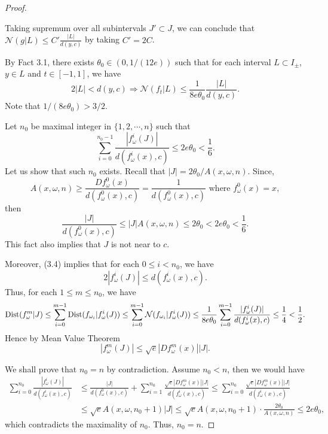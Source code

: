 \documentclass[11pt,oneside]{article}
\theoremstyle{plain}
\numberwithin{equation}{section}
\numberwithin{figure}{section}
\numberwithin{table}{section}
\begin{document}
\begin{proof}
\begin{enumerate}
\end{enumerate}

Taking supremum over all subintervals $J' \subset J$, we can conclude that $\mathcal N(g|L) \leq C' \frac{|L|}{d (y, c)}$ by taking $C' = 2C$.

\fi


By Fact 3.1, there exists $\theta_0 \in (0, 1/(12e))$ such that for each interval $L \subset  I_{\pm}$, $y \in L$ and $t \in [-1, 1]$, we have
\[
2 |L| < d(y, c) \Longrightarrow \mathcal N(f_t|L) \leq \frac{1}{8e\theta_0} \frac{|L|}{d (y, c)}. 
\]
Note that $1/(8e\theta_0) > 3/2$.


Let $n_0$ be maximal integer in $\{1, 2, \cdots, n\}$ such that 
\begin{equation}
\sum_{i=0}^{n_0-1} \frac{|f_{\omega}^i(J)|}{d(f_{\omega}^i(x), c)} \leq 2 e \theta_0 < \frac{1}{6}. 
\end{equation}
Let us show that such $n_0$ exists. Recall that $|J| = 2\theta_0/A(x, \omega, n)$. Since, 
\[
A(x, \omega, n) \geq \frac{Df_{\omega}^0(x)}{d(f_{\omega}^0(x), c)} = \frac{1}{d(f_{\omega}^0(x), c)} \text{ where } f_{\omega}^0(x) = x,
\]
then
\[
\frac{|J|}{d(f_{\omega}^0(x), c)} \leq |J| A(x, \omega, n) \leq 2 \theta_0 < 2e\theta_0 < \frac{1}{6}.
\]
This fact also implies that $J$ is not near to $c$. 

 
Moreover, (3.4) implies that for each $0 \leq i < n_0$, we have
\[
2 |f_{\omega}^i(J)| \leq d(f_{\omega}^i(x), c).
\]
Thus, for each $1 \leq m \leq n_0$, we have
\begin{equation}
{\rm Dist}(f_{\omega}^m |J) \leq \sum_{i=0}^{m-1} {\rm Dist} (f_{\omega_i} | f_{\omega}^i (J)) \leq \sum_{i=0}^{m-1} \mathcal N (f_{\omega_i} | f_{\omega}^i (J)) \leq \frac{1}{8e \theta_0} \sum_{i=0}^{m-1} \frac{|f_{\omega}^i(J)|}{d(f_{\omega}^i(x), c)} \leq \frac{1}{4} < \frac{1}{2}.
\end{equation}
Hence by Mean Value Theorem
\[
|f_{\omega}^m(J)| \leq \sqrt e |D f_{\omega}^m(x)| |J|.
\]


We shall prove that $n_0 = n$ by contradiction. Assume $n_0 < n$, then we would have
\begin{align*}
\sum_{i=0}^{n_0} \frac{|f_{\omega}^i(J)|}{d(f_{\omega}^i(x), c)} & \leq \frac{|J|}{d(f_{\omega}^0(x), c)} + \sum_{i=1}^{n_0} \frac{\sqrt e |D f_{\omega}^m(x)| |J|}{d(f_{\omega}^i(x), c)} \leq \sum_{i=0}^{n_0} \frac{\sqrt e |D f_{\omega}^m(x)| |J|}{d(f_{\omega}^i(x), c)} \\
& \leq \sqrt e A(x, \omega, n_0+1) |J| \leq \sqrt e A(x, \omega, n_0+1) \cdot \frac{2 \theta_0}{A(x, \omega, n)} \leq 2e\theta_0,
\end{align*}
which contradicts the maximality of $n_0$. Thus, $n_0 = n$.



\end{proof}
\end{document}
